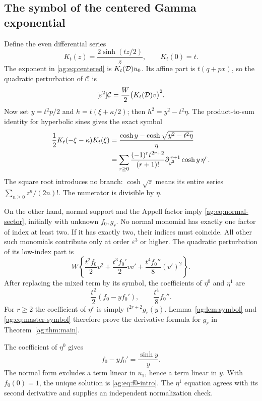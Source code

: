 \subsection{The symbol of the centered Gamma exponential}
Define the even differential series
\[
 K_t(z)=\frac{2\sinh(tz/2)}{z},\qquad K_t(0)=t.
\]
The exponent in \eqref{ag:eq:centered} is $K_t(\mathcal D)u_0$. Its affine
part is $t(q+px)$, so the quadratic perturbation of $\mathcal C$ is
\begin{equation}\label{ag:eq:quadratic-density}
 [\varepsilon^2]\mathcal C=\frac{W}{2}\bigl(K_t(\mathcal D)v\bigr)^2.
\end{equation}
Now set $y=t^2p/2$ and $h=t(\xi+\kappa/2)$; then
$h^2=y^2-t^2\eta$. The product-to-sum identity for hyperbolic sines
gives the exact symbol
\begin{align}
 \frac12K_t(-\xi-\kappa)K_t(\xi)
 &=\frac{\cosh y-\cosh\sqrt{y^2-t^2\eta}}{\eta}\notag\\
 &=\sum_{r\ge0}\frac{(-1)^rt^{2r+2}}{(r+1)!}
           \partial_{y^2}^{\,r+1}\cosh y\,\eta^r.
 \label{ag:eq:master-symbol}
\end{align}
The square root introduces no branch: $\cosh\sqrt z$ means its entire
series $\sum_{n\ge0}z^n/(2n)!$. The numerator is divisible by $\eta$.

On the other hand, normal support and the Appell factor imply
\eqref{ag:eq:normal-sector}, initially with unknown $f_0,g_r$.
No normal monomial has exactly one factor of index at least two.
If it has exactly two, their indices must coincide. All other such
monomials contribute only at order $\varepsilon^3$ or higher.
The quadratic perturbation of its low-index part is
\[
 W\left\{\frac{t^2f_0}{2}v^2+\frac{t^3f_0'}{2}vv'
                         +\frac{t^4f_0''}{8}(v')^2\right\}.
\]
After replacing the mixed term by its symbol, the coefficients of
$\eta^0$ and $\eta^1$ are
\[
 \frac{t^2}{2}(f_0-yf_0'),\qquad \frac{t^4}{8}f_0''.
\]
For $r\ge2$ the coefficient of $\eta^r$ is simply
$t^{2r+2}g_r(y)$. Lemma~\ref{ag:lem:symbol} and
\eqref{ag:eq:master-symbol} therefore prove the derivative formula
for $g_r$ in Theorem~\ref{ag:thm:main}.

The coefficient of $\eta^0$ gives
\begin{equation}\label{ag:eq:f0-ode}
 f_0-yf_0'=\frac{\sinh y}{y}.
\end{equation}
The normal form excludes a term linear in $u_1$, hence a term linear
in $y$. With $f_0(0)=1$, the unique solution is
\eqref{ag:eq:f0-intro}. The $\eta^1$ equation agrees with its second
derivative and supplies an independent normalization check.

